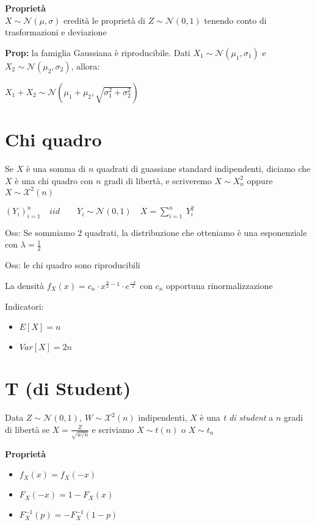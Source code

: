 \documentclass[11pt, letterpaper]{article}
\begin{document}
\textbf{Proprietà}\\ $X\sim\mathcal{N}(\mu,\sigma)$ eredità le proprietà di $Z\sim\mathcal{N}(0,1)$
tenendo conto di trasformazioni e deviazione

\textbf{Prop:} la famiglia  Gaussiana è riproducibile. Dati $X_{1}\sim\mathcal{N}(\mu_{1},\sigma_{1})$
e $X_{2}\sim\mathcal{N}(\mu_{2},\sigma_{2})$, allora:
\begin{center}
    $X_{1}+X_{2}\sim\mathcal{N}(\mu_{1}+\mu_{2},\sqrt{\sigma_{1}^{2}+\sigma_{2}^{2}})$
\end{center}

\section{Chi quadro}
Se $X$ è una somma di $n$ quadrati di guassiane standard indipendenti, diciamo
che $X$ è una chi quadro con $n$ gradi di libertà, e scriveremo $X\sim X^{2}_{n}$ oppure 
$X\sim\mathcal{X}^{2}(n)$
\begin{center}
    $(Y_{i})^{n}_{i=1}\quad iid\qquad Y_{i}\sim\mathcal{N}(0,1)\quad X=\sum_{i=1}^{n}\ Y_{i}^{2}$
\end{center}

Oss: Se sommiamo $2$ quadrati, la distribuzione che otteniamo è una esponenziale con 
$\lambda=\frac{1}{2}$

Oss: le chi quadro sono riproducibili

La densità $f_{X}(x)=c_{n}\cdot x^{\frac{n}{2}-1}\cdot e^{\frac{-x}{2}}$ con $c_{n}$ opportuna
rinormalizzazione

Indicatori:
\begin{itemize}
    \item $E[X]=n$
    \item $Var[X]=2n$
\end{itemize}

\section{T (di Student)}
Data $Z\sim\mathcal{N}(0,1),\ W\sim \mathcal{X}^{2}(n)$ indipendenti, $X$ è una \textit{t di student}
a $n$ gradi di libertà se $X=\frac{Z}{\sqrt{w/n}}$ e scriviamo $X\sim t(n)$ o $X\sim t_{n}$

\textbf{Proprietà}
\begin{itemize}
    \item $f_{X}(x)=f_{X}(-x)$
    \item $F_{X}(-x)=1-F_{X}(x)$
    \item $F^{-1}_{X}(p)=-F^{-1}_{X}(1-p)$
\end{itemize}
\end{document}
